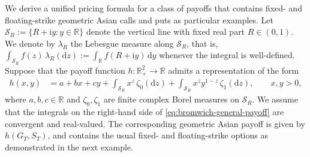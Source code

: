 \documentclass[10pt,a4paper,reqno]{amsart}
\theoremstyle{plain}
\theoremstyle{definition}
\theoremstyle{remark}
\theoremstyle{example}
\begin{document}
We derive a unified pricing formula for a class of payoffs that contains fixed- and floating-strike geometric Asian calls and puts as particular examples. Let $\mathcal{S}_R := \{R+\mathrm{i}y:y\in\mathbb{R}\}$ denote the vertical line with fixed real part $R\in(0,1)$. We denote by $\lambda_R$ the Lebesgue measure along $\mathcal{S}_R$, that is, $\int_{\mathcal{S}_R} f(z)\,\lambda_R(\mathrm{d}z) := \int_{\mathbb{R}} f(R+\mathrm{i}y)\,\mathrm{d}y$ whenever the integral is well-defined. Suppose that the payoff function $h:\mathbb{R}_+^2\longrightarrow\mathbb{R}$ admits a representation of the form
\begin{align}\label{eq:bromwich-general-payoff}
    h(x,y) &= a+bx+cy + \int_{\mathcal{S}_R}x^z\,\zeta_0(\mathrm{d}z) + \int_{\mathcal{S}_R}x^z y^{1-z}\,  \zeta_1(\mathrm{d}z), \qquad x,y>0,
\end{align}
where $a,b,c\in\mathbb{R}$ and $\zeta_0,\zeta_1$ are finite complex Borel measures on $\mathcal{S}_R$. We assume that the integrals on the right-hand side of \eqref{eq:bromwich-general-payoff} are convergent and real-valued. The corresponding geometric Asian payoff is given by $h(G_T,S_T)$, and contains the usual fixed- and floating-strike options as demonstrated in the next example.
\end{document}
